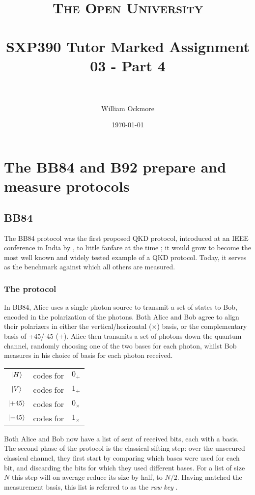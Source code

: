 \documentclass[paper=a4, fontsize=11pt]{scrartcl} %
\title{
\normalfont \normalsize
\textsc{The Open University} \\ [25pt] %
\horrule{0.5pt} \\[0.4cm] %
\huge SXP390 Tutor Marked Assignment 03 - Part 4 \\ %
\horrule{2pt} \\[0.5cm] %
}
\author{William Ockmore} %
\date{\normalsize\today} %
\numberwithin{equation}{section} %
\numberwithin{figure}{section} %
\numberwithin{table}{section} %
\begin{document}
\maketitle %


\section{The BB84 and B92 prepare and measure protocols}

\subsection{BB84}

The BB84 protocol was the first proposed QKD protocol, introduced at
an IEEE conference in India by \citet{BB84}, to little fanfare at the
time \citep{historyBrassard}; it would grow to become the most well known
and widely tested example of a QKD protocol. Today, it serves as
the benchmark against which all others are measured.

\subsubsection{The protocol}
In BB84, Alice uses a single photon source to transmit a set of states to Bob,
encoded in the polarization of the photons. Both Alice and Bob agree to align
their polarizers in either the vertical/horizontal ($\times$) basis, or the
complementary basis of +45/-45 ($+$). Alice then transmits a set of photons
down the quantum channel, randomly choosing one of the two bases for each
photon, whilst Bob measures in his choice of basis for each photon received.

\begin{center}
\begin{tabular}{c c c}
	$\ket{H}$  & codes for & $0_+$ \\
	$\ket{V}$  & codes for & $1_+$ \\
	$\ket{+45}$  & codes for & $0_\times$ \\
	$\ket{-45}$  & codes for & $1_\times$ \\
\end{tabular}
\end{center}

Both Alice and Bob now have a list of sent of received bits, each with a basis. The second
phase of the protocol is the classical sifting step: over the unsecured classical channel, they
first start by comparing which bases were used for each bit, and discarding the bits for which
they used different bases. For a list of size $N$ this step will on average reduce its size by half,
to $N/2$. Having matched the measurement basis, this list is referred to as the \textit{raw key} \citep{gisin2002}.
\end{document}
